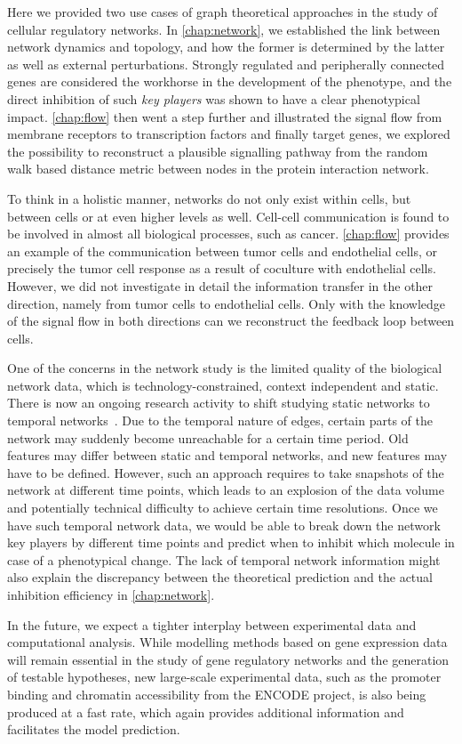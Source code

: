 Here we provided two use cases of graph theoretical approaches
in the study of cellular regulatory networks. 
In \ref{chap:network}, we established the link between network
dynamics and topology, and how the former is determined by
the latter as well as external perturbations. Strongly 
regulated and peripherally connected genes are considered 
the workhorse in the development of the phenotype, and the
direct inhibition of such \emph{key players} was shown to 
have a clear phenotypical impact. \ref{chap:flow} then
went a step further and illustrated the signal flow from
membrane receptors to transcription factors and finally 
target genes, we explored the possibility to reconstruct
a plausible signalling pathway from the random walk based
distance metric between nodes in the protein interaction
network.

To think in a holistic manner, networks do not only exist
within cells, but between cells or at even higher levels
as well. Cell-cell communication is found to be involved
in almost all biological processes, such as cancer. 
\ref{chap:flow} provides an example of the communication
between tumor cells and endothelial cells, or precisely
the tumor cell response as a result of coculture with 
endothelial cells. However, we did not investigate in detail 
the information
transfer in the other direction, namely from tumor cells
to endothelial cells. Only with the knowledge of the signal
flow in both directions can we reconstruct the feedback loop
between cells.

One of the concerns in the network study is the limited
quality of the biological network data, which is 
technology-constrained, context independent and static. 
There is now an ongoing research activity to shift studying
static networks to temporal networks~\citep{Holme2012}.
Due to the temporal nature of edges, certain parts of
the network may suddenly become unreachable for a certain
time period. Old features may differ between static and
temporal networks, and new features may have to be 
defined. However, such an approach requires to take 
snapshots of the network at different time points, which
leads to an explosion of the data volume and potentially
technical difficulty to achieve certain time resolutions.
Once we have such temporal network data, we would be
able to break down the network key players by different
time points and predict when to inhibit
which molecule in case of a phenotypical change. 
The lack of temporal network information might also
explain the discrepancy between the theoretical 
prediction and the actual inhibition efficiency in
\ref{chap:network}.

In the future, we expect a tighter interplay between 
experimental data and computational analysis. While
modelling methods based on gene expression 
data will remain essential 
in the study of gene regulatory networks and the 
generation of testable hypotheses, new large-scale 
experimental
data, such as the promoter binding and chromatin 
accessibility from the ENCODE project, is also being
produced at a fast rate, which again provides
additional information and facilitates the model
prediction.
